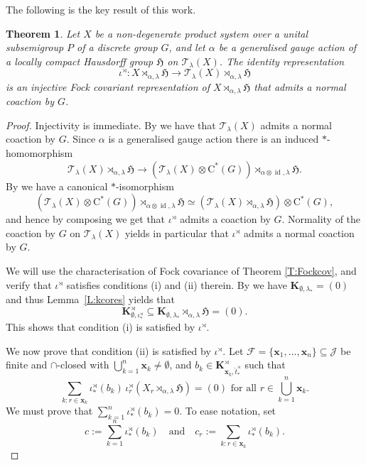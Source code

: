 \documentclass[11pt,final]{amsart}
\numberwithin{equation}{section}
\theoremstyle{plain}
\newtheorem{theorem}{Theorem}[section]
\theoremstyle{definition}
\theoremstyle{remark}
\newcommand{\F}{{\mathcal{F}}}
\newcommand{\J}{{\mathcal{J}}}
\newcommand{\T}{{\mathcal{T}}}
\def\al{\alpha}
\def\io{\iota}
\def\la{\lambda}
\newcommand{\fH}{{\mathfrak{H}}}
\newcommand{\foral}{\text{ for all }}
\newcommand{\qand}{\quad\text{and}\quad}
\newcommand{\ca}{\mathrm{C}^*}
\newcommand{\id}{{\operatorname{id}}}
\newcommand{\mt}{\emptyset}
\newcommand{\bo}[1]{\mathbf{#1}} %
\begin{document}
The following is the key result of this work.

\begin{theorem}\label{T:idisfock}
Let $X$ be a non-degenerate product system over a unital subsemigroup $P$ of a discrete group
$G$, and let $\al$ be a generalised gauge action of a locally compact Hausdorff group
$\fH$ on $\T_\la(X)$.  The identity representation
\[
\io^\rtimes \colon X\rtimes_{\al,\la}\fH
\to
\T_\la(X)\rtimes_{\al,\la}\fH
\]
is an injective Fock covariant representation of $X\rtimes_{\al,\la}\fH$ that admits a normal coaction by $G$.
\end{theorem}

\begin{proof}
Injectivity is immediate.  By \cite[Proposition 4.1]{DKKLL22} we have that $\T_\la(X)$ admits a normal coaction by $G$. Since $\al$ is a generalised gauge action there is an induced $*$-homomorphism
\[
\T_\la(X)\rtimes_{\al,\la}\fH \to (\T_\la(X) \otimes \ca(G)) \rtimes_{\al\otimes \id, \la} \fH.
\]
By \cite[Lemma~7.16]{Wil07} we have a canonical $*$-isomorphism
\[
 (\T_\la(X) \otimes \ca(G)) \rtimes_{\al\otimes \id, \la} \fH
 \simeq 
 (\T_\la(X) \rtimes_{\al, \la} \fH) \otimes \ca(G),
\]
and hence by composing we get that $\io^\rtimes$ admits a coaction by $G$. Normality of the coaction by $G$ on $\T_\la(X)$ yields in particular that $\io^\rtimes$ admits a normal coaction by $G$.

We will use the characterisation of Fock covariance of Theorem \ref{T:Fockcov}, and verify that $\io^\rtimes$ satisfies conditions (i) and (ii) therein. By \cite[Proposition 2.4]{KP25} we have $\bo{K}_{\mt,\la_\ast}=(0)$ and thus Lemma~\ref{L:kcores} yields that
\[
\bo{K}^\rtimes_{\mt,\io^\rtimes_\ast}
\subseteq
\bo{K}_{\mt,\la_\ast}\rtimes_{\al,\la}\fH=(0).
\]
This shows that condition (i) is satisfied by $\io^\rtimes$.

We now prove that condition (ii) is satisfied by $\io^\rtimes$.  Let
$\F=\{\bo{x}_1,\dots,\bo{x}_n\}\subseteq\J$ be finite and $\cap$-closed with
$\bigcup_{k=1}^n\bo{x}_k\neq\mt$, and
$b_k\in\bo{K}^{\rtimes}_{\bo{x}_k,\widehat t^\rtimes_\ast}$ such that
\[
\sum_{k:r\in\bo{x}_k}\io^\rtimes_\ast(b_k)\,
\io^\rtimes_r(X_r\rtimes_{\al,\la}\fH)=(0)
\foral r\in\bigcup_{k=1}^n\bo{x}_k.
\]
We must prove that $\sum_{k=1}^n\io^\rtimes_\ast(b_k)=0$.  To ease notation, set
\[
c:=\sum_{k=1}^n\io^\rtimes_\ast(b_k) \qand c_r:=\sum_{k:r\in\bo{x}_k}\io^\rtimes_\ast(b_k).
\]


\end{proof}
\end{document}
